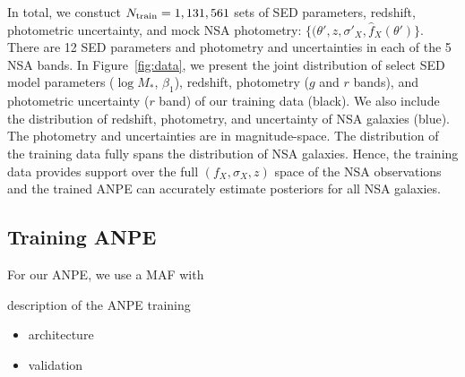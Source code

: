 In total, we constuct $N_{\rm train} = 1,131,561$ sets of SED parameters,
redshift, photometric uncertainty, and mock NSA photometry: 
$\{(\theta', z, \sigma'_X, \hat{f}_X(\theta') \}$.
There are 12 SED parameters and photometry and uncertainties in each of the 5
NSA bands. 
In Figure~\ref{fig:data}, we present the joint distribution of select SED model
parameters ($\log M_*$, $\beta_1$), redshift, photometry ($g$ and $r$ bands),
and photometric uncertainty ($r$ band) of our training data (black).
We also include the distribution of redshift, photometry, and uncertainty of
NSA galaxies (blue).
The photometry and uncertainties are in magnitude-space. 
The distribution of the training data fully spans the distribution of NSA
galaxies.
Hence, the training data provides support over the full $(f_X, \sigma_X, z)$
space of the NSA observations and the trained ANPE can accurately estimate
posteriors for all NSA galaxies. 

\subsection{Training ANPE} \label{sec:anpe}
For our ANPE, we use a MAF with 

description of the ANPE training
\begin{itemize}
    \item architecture
    \item validation 
\end{itemize}
